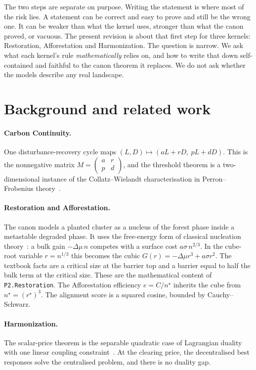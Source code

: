 \documentclass[11pt]{article}
\theoremstyle{definition}
\theoremstyle{remark}
\begin{document}
The two steps are separate on purpose. Writing the statement is where most of the risk lies.
A statement can be correct and easy to prove and still be the wrong one. It can be weaker than what the kernel uses,
stronger than what the canon proved, or vacuous. The present revision is about that first step for three kernels:
Restoration, Afforestation and Harmonization.
The question is narrow. We ask what each kernel's rule \emph{mathematically} relies on, and how to write that down
self-contained and faithful to the canon theorem it replaces. We do not ask whether the models describe any real landscape.

\section{Background and related work}
\paragraph{Carbon Continuity.} One disturbance-recovery cycle maps $(L,D)\mapsto(aL+rD,\ pL+dD)$.
This is the nonnegative matrix $M=\begin{pmatrix}a&r\\p&d\end{pmatrix}$, and the threshold theorem is a
two-dimensional instance of the Collatz--Wielandt characterisation in Perron--Frobenius theory~\cite{BermanPlemmons1994}.

\paragraph{Restoration and Afforestation.} The canon models a planted cluster as a nucleus of the forest phase inside a
metastable degraded phase. It uses the free-energy form of classical nucleation theory~\cite{Kashchiev2000}:
a bulk gain $-\Delta\mu\, n$ competes with a surface cost $a\sigma\, n^{2/3}$.
In the cube-root variable $r=n^{1/3}$ this becomes the cubic $G(r)=-\Delta\mu r^3+a\sigma r^2$.
The textbook facts are a critical size at the barrier top and a barrier equal to half the bulk term at the critical size.
These are the mathematical content of \texttt{P2.Restoration}.
The Afforestation efficiency $e=C/n^\star$ inherits the cube from $n^\star=(r^\star)^3$.
The alignment score is a squared cosine, bounded by Cauchy--Schwarz.

\paragraph{Harmonization.} The scalar-price theorem is the separable quadratic case of Lagrangian duality with
one linear coupling constraint~\cite{BoydVandenberghe2004}.
At the clearing price, the decentralised best responses solve the centralised problem, and there is no duality gap.
\end{document}

